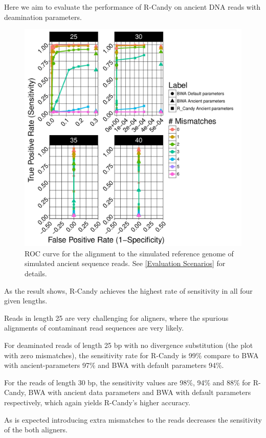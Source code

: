 \documentclass[11pt,a4paper]{report}
\begin{document}
Here we aim to evaluate the performance of R-Candy on ancient DNA reads
with deamination parameters.


\begin{figure}[H]
\centering
\includegraphics[width=12cm]{pictures/bROC_DS1_emp.pdf}

\caption{
ROC curve for the alignment to the simulated reference genome of simulated ancient
sequence reads. See \ref{Evaluation Scenarios} for details.}
\label{DS1_emp}
\end{figure}


As the result shows, R-Candy achieves the highest rate of sensitivity
in all four given lengths.

Reads in length 25 are very challenging for aligners, where
the spurious alignments of contaminant read sequences are very likely.

For deaminated reads of length 25 bp with no divergence substitution 
(the plot with zero mismatches), the sensitivity rate for R-Candy is 99\% 
compare to BWA with ancient-parameters 97\% and BWA with default parameters 94\%. 


For the reads of length 30 bp, the sensitivity values are 98\%, 94\% 
and 88\% for R-Candy, BWA with ancient data parameters and BWA with 
default parameters respectively, which again yields R-Candy's higher
accuracy.

As is expected introducing extra mismatches to the reads decreases  
the sensitivity of the both aligners.
\end{document}
